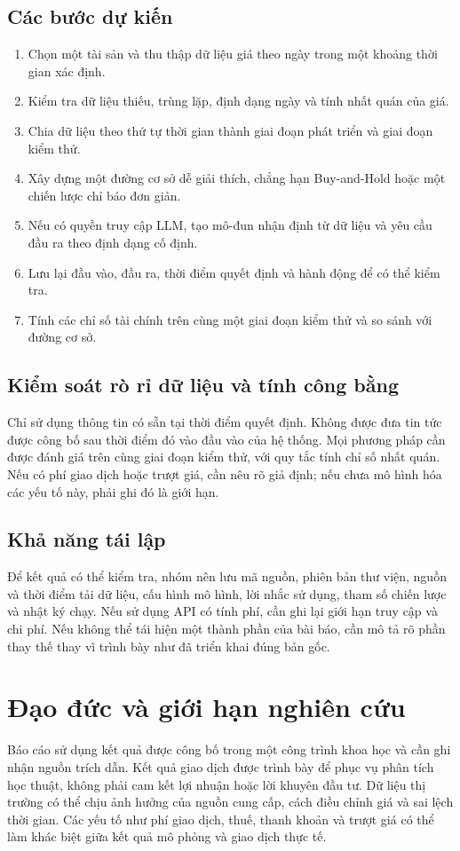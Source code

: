 \subsection{Các bước dự kiến}
\begin{enumerate}
    \item Chọn một tài sản và thu thập dữ liệu giá theo ngày trong một khoảng thời gian xác định.
    \item Kiểm tra dữ liệu thiếu, trùng lặp, định dạng ngày và tính nhất quán của giá.
    \item Chia dữ liệu theo thứ tự thời gian thành giai đoạn phát triển và giai đoạn kiểm thử.
    \item Xây dựng một đường cơ sở dễ giải thích, chẳng hạn Buy-and-Hold hoặc một chiến lược chỉ báo đơn giản.
    \item Nếu có quyền truy cập LLM, tạo mô-đun nhận định từ dữ liệu và yêu cầu đầu ra theo định dạng cố định.
    \item Lưu lại đầu vào, đầu ra, thời điểm quyết định và hành động để có thể kiểm tra.
    \item Tính các chỉ số tài chính trên cùng một giai đoạn kiểm thử và so sánh với đường cơ sở.
\end{enumerate}

\subsection{Kiểm soát rò rỉ dữ liệu và tính công bằng}
Chỉ sử dụng thông tin có sẵn tại thời điểm quyết định. Không được đưa tin tức được công bố sau thời điểm đó vào đầu vào của hệ thống. Mọi phương pháp cần được đánh giá trên cùng giai đoạn kiểm thử, với quy tắc tính chỉ số nhất quán. Nếu có phí giao dịch hoặc trượt giá, cần nêu rõ giả định; nếu chưa mô hình hóa các yếu tố này, phải ghi đó là giới hạn.

\subsection{Khả năng tái lập}
Để kết quả có thể kiểm tra, nhóm nên lưu mã nguồn, phiên bản thư viện, nguồn và thời điểm tải dữ liệu, cấu hình mô hình, lời nhắc sử dụng, tham số chiến lược và nhật ký chạy. Nếu sử dụng API có tính phí, cần ghi lại giới hạn truy cập và chi phí. Nếu không thể tái hiện một thành phần của bài báo, cần mô tả rõ phần thay thế thay vì trình bày như đã triển khai đúng bản gốc.

\section{Đạo đức và giới hạn nghiên cứu}
Báo cáo sử dụng kết quả được công bố trong một công trình khoa học và cần ghi nhận nguồn trích dẫn. Kết quả giao dịch được trình bày để phục vụ phân tích học thuật, không phải cam kết lợi nhuận hoặc lời khuyên đầu tư. Dữ liệu thị trường có thể chịu ảnh hưởng của nguồn cung cấp, cách điều chỉnh giá và sai lệch thời gian. Các yếu tố như phí giao dịch, thuế, thanh khoản và trượt giá có thể làm khác biệt giữa kết quả mô phỏng và giao dịch thực tế.

